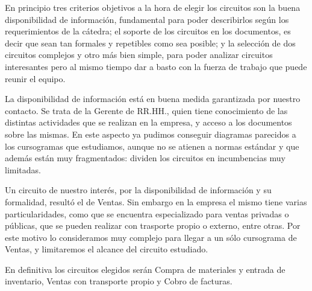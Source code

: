 \documentclass[12pt,titlepage]{article}
\begin{document}
En principio tres criterios objetivos a la hora de elegir los circuitos son la buena disponibilidad de informaci\'on, fundamental para poder describirlos seg\'un los requerimientos de la c\'atedra; el soporte de los circuitos en los documentos, es decir que sean tan formales y repetibles como sea posible; y la selecci\'on de dos circuitos complejos y otro m\'as bien simple, para poder analizar circuitos interesantes pero al mismo tiempo dar a basto con la fuerza de trabajo que puede reunir el equipo.

La disponibilidad de informaci\'on est\'a en buena medida garantizada por nuestro contacto. Se trata de la Gerente de RR.HH., quien tiene conocimiento de las distintas actividades que se realizan en la empresa, y acceso a los documentos sobre las mismas. En este aspecto ya pudimos conseguir diagramas parecidos a los cursogramas que estudiamos, aunque no se atienen a normas est\'andar y que adem\'as est\'an muy fragmentados: dividen los circuitos en incumbencias muy limitadas.

Un circuito de nuestro inter\'es, por la disponibilidad de informaci\'on y su formalidad, result\'o el de Ventas. Sin embargo en la empresa el mismo tiene varias particularidades, como que se encuentra especializado para ventas privadas o p\'ublicas, que se pueden realizar con trasporte propio o externo, entre otras. Por este motivo lo consideramos muy complejo para llegar a un s\'olo cursograma de Ventas, y limitaremos el alcance del circuito estudiado.

En definitiva los circuitos elegidos ser\'an Compra de materiales y entrada de inventario, Ventas con transporte propio y Cobro de facturas.
\end{document}
